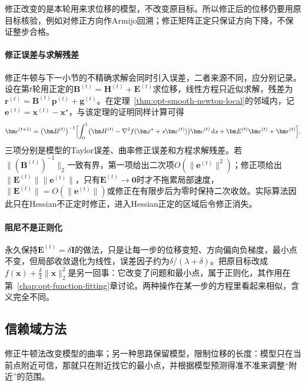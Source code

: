 修正改变的是本轮用来求位移的模型，不改变原目标。所以修正后的位移仍要用原目标核验，例如对修正方向作Armijo回溯；修正矩阵正定只保证方向下降，不保证整步合格。

\paragraph{修正误差与求解残差}
修正牛顿与下一小节的不精确求解会同时引入误差，二者来源不同，应分别记录。设在第$t$轮用正定的$\bm B^{(t)}=\bm H^{(t)}+\bm E^{(t)}$求位移，线性方程只近似求解，残差为$\bm r^{(t)}=\bm B^{(t)}\bm p^{(t)}+\bm g^{(t)}$。在定理~\ref{thm:opt-smooth-newton-local}的邻域内，记$\bm e^{(t)}=\bm x^{(t)}-\bm x^\star$，与该定理的证明同样计算可得
\[
  \bm e^{(t+1)}=\bigl(\bm B^{(t)}\bigr)^{-1}\Bigl[\int_0^1\bigl(\bm H^{(t)}-\nabla^2f(\bm x^\star+s\bm e^{(t)})\bigr)\bm e^{(t)}\,\mathrm ds+\bm E^{(t)}\bm e^{(t)}+\bm r^{(t)}\Bigr].
\]
三项分别是模型的Taylor误差、曲率修正误差和方程求解残差。若$\lVert(\bm B^{(t)})^{-1}\rVert_2$一致有界，第一项给出二次项$O(\lVert\bm e^{(t)}\rVert^2)$；修正项给出$\lVert\bm E^{(t)}\rVert\lVert\bm e^{(t)}\rVert$，只有$\bm E^{(t)}\to\bm0$时才不拖累局部速度，$\lVert\bm E^{(t)}\rVert=O(\lVert\bm e^{(t)}\rVert)$或修正在有限步后为零时保持二次收敛。实际算法因此只在Hessian不正定时修正，进入Hessian正定的区域后令修正消失。

\paragraph{阻尼不是正则化}
永久保持$\bm E^{(t)}=\delta\bm I$的做法，只是让每一步的位移变短、方向偏向负梯度，最小点不变，但局部收敛退化为线性，误差因子约为$\delta/(\lambda+\delta)$。把原目标改成$f(\bm x)+\tfrac\delta2\lVert\bm x\rVert_2^2$是另一回事：它改变了问题和最小点，属于正则化，其作用在第~\ref{chap:opt-function-fitting}章讨论。两种操作在某一步的方程里看起来相似，含义完全不同。

\subsection{信赖域方法}
\label{sec:opt-smooth-trust-region}

修正牛顿法改变模型的曲率；另一种思路保留模型，限制位移的长度：模型只在当前点附近可信，那就只在附近找它的最小点，并根据模型预测得准不准来调整“附近”的范围。

